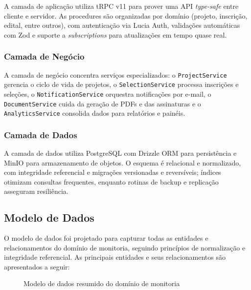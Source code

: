 \documentclass[portuguese]{sbc2025}%
\begin{document}
A camada de aplicação utiliza tRPC v11 para prover uma API \textit{type-safe} entre cliente e servidor. As procedures são organizadas por domínio (projeto, inscrição, edital, entre outros), com autenticação via Lucia Auth, validações automáticas com Zod e suporte a \textit{subscriptions} para atualizações em tempo quase real.

\subsubsection{Camada de Negócio}

A camada de negócio concentra serviços especializados: o \texttt{ProjectService} gerencia o ciclo de vida de projetos, o \texttt{SelectionService} processa inscrições e seleções, o \texttt{NotificationService} orquestra notificações por e-mail, o \texttt{DocumentService} cuida da geração de PDFs e das assinaturas e o \texttt{AnalyticsService} consolida dados para relatórios e painéis.

\subsubsection{Camada de Dados}

A camada de dados utiliza PostgreSQL com Drizzle ORM para persistência e MinIO para armazenamento de objetos. O esquema é relacional e normalizado, com integridade referencial e migrações versionadas e reversíveis; índices otimizam consultas frequentes, enquanto rotinas de backup e replicação asseguram resiliência.

\subsection{Modelo de Dados}

O modelo de dados foi projetado para capturar todas as entidades e relacionamentos do domínio de monitoria, seguindo princípios de normalização e integridade referencial. As principais entidades e seus relacionamentos são apresentados a seguir:

\begin{figure}[h!]
  \centering
{}
  \caption{Modelo de dados resumido do domínio de monitoria}
  \label{fig:data-model}
\end{figure}
\end{document}
